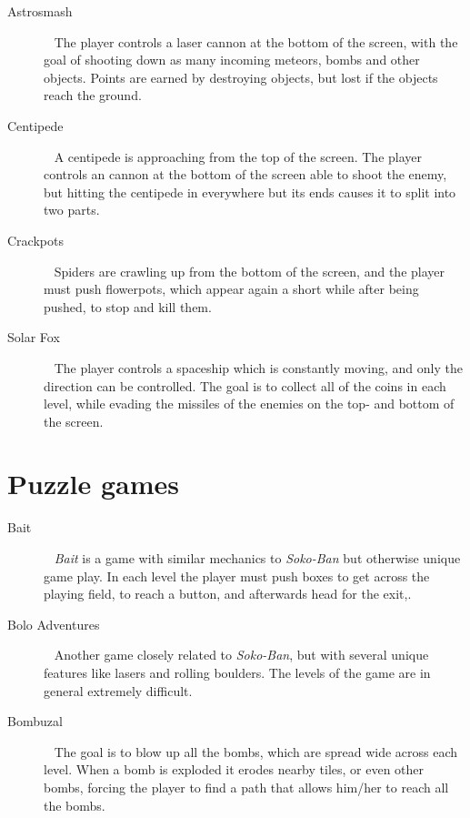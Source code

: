 \documentclass[a4paper,titlepage,final]{report}
\begin{document}
\begin{appendices}
\begin{description}
\item [Astrosmash] ~\citep{game:astrosmash} The player controls a laser cannon at the bottom of the screen, with the goal of shooting down as many incoming meteors, bombs and other objects. Points are earned by destroying objects, but lost if the objects reach the ground.
\item [Centipede]~\citep{game:centipede} A centipede is approaching from the top of the screen. The player controls an cannon at the bottom of the screen able to shoot the enemy, but hitting the centipede in everywhere but its ends causes it to split into two parts.
\item [Crackpots]~\citep{game:crackpots} Spiders are crawling up from the bottom of the screen, and the player must push flowerpots, which appear again a short while after being pushed, to stop and kill them. 
\item [Solar Fox]~\citep{game:solarfox} The player controls a spaceship which is constantly moving, and only the direction can be controlled. The goal is to collect all of the coins in each level, while evading the missiles of the enemies on the top- and bottom of the screen.
\end{description}


\section{Puzzle games}

\begin{description}
\item [Bait]~\citep{game:bait} \textit{Bait} is a game with similar mechanics to \textit{Soko-Ban} but otherwise unique game play. In each level the player must push boxes to get across the playing field, to reach a button, and afterwards head for the exit,.
\item [Bolo Adventures]~\citep{game:boloadventures} Another game closely related to \textit{Soko-Ban}, but with several unique features like lasers and rolling boulders. The levels of the game are in general extremely difficult.
\item [Bombuzal]~\citep{game:bombuzal} The goal is to blow up all the bombs, which are spread wide across each level. When a bomb is exploded it erodes nearby tiles, or even other bombs, forcing the player to find a path that allows him/her to reach all the bombs.


\end{description}
\end{appendices}
\end{document}
